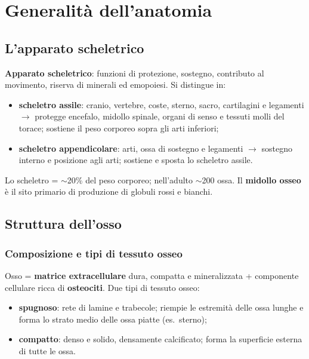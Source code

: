 \chapter{Generalità dell'anatomia}

\section{L'apparato scheletrico}

\textbf{Apparato scheletrico}: funzioni di protezione, sostegno, contributo al movimento, riserva
di minerali ed emopoiesi. Si distingue in:
\begin{itemize}
  \item \textbf{scheletro assile}: cranio, vertebre, coste, sterno, sacro, cartilagini e legamenti
    $\rightarrow$ protegge encefalo, midollo spinale, organi di senso e tessuti molli del torace;
    sostiene il peso corporeo sopra gli arti inferiori;
  \item \textbf{scheletro appendicolare}: arti, ossa di sostegno e legamenti $\rightarrow$ sostegno
    interno e posizione agli arti; sostiene e sposta lo scheletro assile.
\end{itemize}
Lo scheletro = $\sim$20\% del peso corporeo; nell'adulto $\sim$200 ossa. Il \textbf{midollo osseo}
è il sito primario di produzione di globuli rossi e bianchi.

\section{Struttura dell'osso}

\subsection{Composizione e tipi di tessuto osseo}
Osso = \textbf{matrice extracellulare} dura, compatta e mineralizzata + componente cellulare ricca
di \textbf{osteociti}. Due tipi di tessuto osseo:
\begin{itemize}
  \item \textbf{spugnoso}: rete di lamine e trabecole; riempie le estremità delle ossa lunghe e
    forma lo strato medio delle ossa piatte (es.\ sterno);
  \item \textbf{compatto}: denso e solido, densamente calcificato; forma la superficie esterna di
    tutte le ossa.
\end{itemize}

